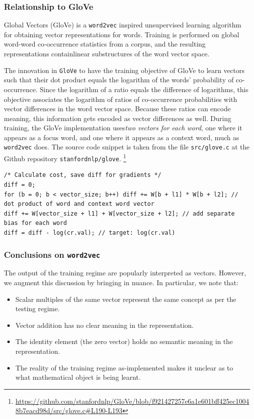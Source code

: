\documentclass[11pt]{book}
\begin{document}

\subsubsection{Relationship to GloVe}

Global Vectors (GloVe) \cite{pennington2014glove} is a \texttt{word2vec}
inspired  unsupervised learning algorithm for obtaining vector representations
for words. Training is performed on global word-word co-occurrence statistics
from a corpus, and the resulting representations containlinear substructures of
the word vector space. 


The innovation in \texttt{GloVe} to have the
training objective of GloVe to learn 
vectors such that their dot product equals the logarithm of the words'
probability of co-occurrence. Since the logarithm of a ratio
equals the difference of logarithms, this objective associates the logarithm
of ratios of co-occurrence probabilities with vector differences in the word
vector space. Because these ratios can encode meaning, this
information gets encoded as vector differences as well. During training,
the GloVe implementation uses\emph{two vectors for each word}, one where it
appears as a focus word, and one where it appears as a context word, much as
\texttt{word2vec} does. The source code snippet is taken from the file \texttt{src/glove.c} at 
the Github repository \texttt{stanfordnlp/glove}.
\footnote{\url{https://github.com/stanfordnlp/GloVe/blob/f921427257e6a1e601bff425ec10048b7eacd98d/src/glove.c\#L190-L193}}

\begin{verbatim}
/* Calculate cost, save diff for gradients */
diff = 0;
for (b = 0; b < vector_size; b++) diff += W[b + l1] * W[b + l2]; // dot product of word and context word vector
diff += W[vector_size + l1] + W[vector_size + l2]; // add separate bias for each word
diff = diff - log(cr.val); // target: log(cr.val)
\end{verbatim}

\subsubsection{Conclusions on \texttt{word2vec}}

The output of the training regime are popularly interpreted as vectors.
However, we augment this discussion by bringing in nuance. In particular, we
note that:
\begin{itemize}
\item Scalar multiples of the same vector represent the same concept as per the testing regime.
\item Vector addition has no clear meaning in the representation.
\item The identity element (the zero vector) holds no semantic meaning in the representation.
\item The reality of the training regime as-implemented makes it unclear as to
      what mathematical object is being learnt.
\end{itemize}
\end{document}
